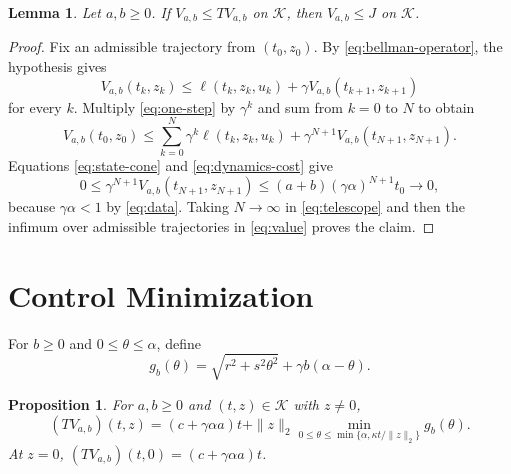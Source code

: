 \documentclass[10pt]{article}
\newtheorem{proposition}{Proposition}
\newtheorem{lemma}{Lemma}
\begin{document}
\begin{lemma}
\label{lem:lower-bound}
Let $a,b\geq0$. If $V_{a,b}\leq TV_{a,b}$ on $\mathcal K$, then $V_{a,b}\leq J$ on $\mathcal K$.
\end{lemma}

\begin{proof}
Fix an admissible trajectory from $(t_0,z_0)$. By \eqref{eq:bellman-operator}, the hypothesis gives
\begin{equation}
V_{a,b}(t_k,z_k)\leq
\ell(t_k,z_k,u_k)+\gamma V_{a,b}(t_{k+1},z_{k+1})
\label{eq:one-step}
\end{equation}
for every $k$. Multiply \eqref{eq:one-step} by $\gamma^k$ and sum from $k=0$ to $N$ to obtain
\begin{equation}
V_{a,b}(t_0,z_0)\leq
\sum_{k=0}^{N}\gamma^k\ell(t_k,z_k,u_k)
+\gamma^{N+1}V_{a,b}(t_{N+1},z_{N+1}).
\label{eq:telescope}
\end{equation}
Equations \eqref{eq:state-cone} and \eqref{eq:dynamics-cost} give
\begin{equation}
0\leq\gamma^{N+1}V_{a,b}(t_{N+1},z_{N+1})
\leq(a+b)(\gamma\alpha)^{N+1}t_0\longrightarrow0,
\label{eq:tail-bound}
\end{equation}
because $\gamma\alpha<1$ by \eqref{eq:data}. Taking $N\to\infty$ in \eqref{eq:telescope} and then the infimum over admissible trajectories in \eqref{eq:value} proves the claim.
\end{proof}

\section{Control Minimization}

For $b\geq0$ and $0\leq\theta\leq\alpha$, define
\begin{equation}
g_b(\theta)=\sqrt{r^2+s^2\theta^2}+\gamma b(\alpha-\theta).
\label{eq:scalar-objective}
\end{equation}

\begin{proposition}
\label{prop:reduction}
For $a,b\geq0$ and $(t,z)\in\mathcal K$ with $z\ne0$,
\begin{equation}
(TV_{a,b})(t,z)
=(c+\gamma\alpha a)t+
\|z\|_2\min_{0\leq\theta\leq
\min\{\alpha,\kappa t/\|z\|_2\}}g_b(\theta).
\label{eq:reduced-bellman}
\end{equation}
At $z=0$, $(TV_{a,b})(t,0)=(c+\gamma\alpha a)t$.
\end{proposition}
\end{document}

